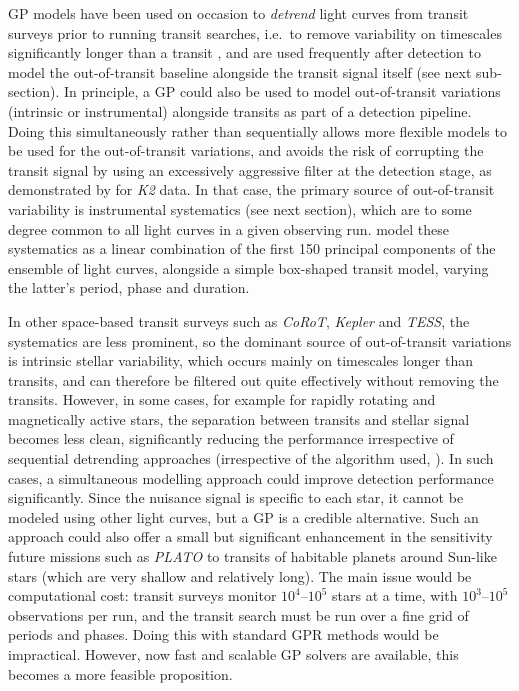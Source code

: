 \documentclass[letterpaper]{ar-1col}
\begin{document}
GP models have been used on occasion to \textit{detrend} light curves from transit surveys prior to running transit searches, i.e.\ to remove variability on timescales significantly longer than a transit \citet[see e.g.][]{2016ApJS..226....7C}, and are used frequently after detection to model the out-of-transit baseline alongside the transit signal itself (see next sub-section). In principle, a GP could also be used to model out-of-transit variations (intrinsic or instrumental) alongside transits as part of a detection pipeline. Doing this simultaneously rather than sequentially allows more flexible models to be used for the out-of-transit variations, and avoids the risk of corrupting the transit signal by using an excessively aggressive filter at the detection stage, as demonstrated by \citet{2015ApJ...806..215F} for \textit{K2} data. In that case, the primary source of out-of-transit variability is instrumental systematics (see next section), which are to some degree common to all light curves in a given observing run. \citet{2015ApJ...806..215F} model these systematics as a linear combination of the first 150 principal components of the ensemble of light curves, alongside a simple box-shaped transit model, varying the latter's period, phase and duration. 

In other space-based transit surveys such as \textit{CoRoT}, \emph{Kepler} and \emph{TESS}, the systematics are less prominent, so the dominant source of out-of-transit variations is intrinsic stellar variability, which occurs mainly on timescales longer than transits, and can therefore be filtered out quite effectively without removing the transits. However, in some cases, for example for rapidly rotating and magnetically active stars, the separation between transits and stellar signal becomes less clean, significantly reducing the performance irrespective of sequential detrending approaches (irrespective of the algorithm used, \citealt{wotan}). 
In such cases, a simultaneous modelling approach could improve detection performance significantly. Since the nuisance signal is specific to each star, it cannot be modeled using other light curves, but a GP is a credible alternative. Such an approach could also offer a small but significant enhancement in the sensitivity future missions such as \textit{PLATO} to transits of habitable planets around Sun-like stars (which are very shallow and relatively long). The main issue would be computational cost: transit surveys monitor $10^4$--$10^5$ stars at a time, with $10^3$--$10^5$ observations per run, and the transit search must be run over a fine grid of periods and phases. Doing this with standard GPR methods would be impractical. However, now fast and scalable GP solvers are available, this becomes a more feasible proposition.
\end{document}
